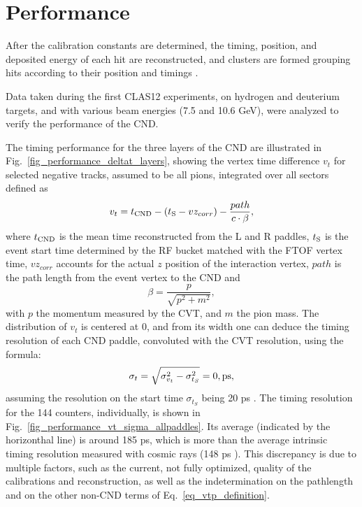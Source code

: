 \section{Performance}
After the calibration constants are determined, the timing, position, and deposited energy of each hit are reconstructed, and clusters are formed grouping hits according to their position and timings \cite{recon-nim}.

Data taken during the first CLAS12 experiments, on hydrogen and deuterium targets, and with various beam energies (7.5 and 10.6 GeV), were analyzed to verify the performance of the CND. 

The timing performance for the three layers of the CND are illustrated in Fig.~\ref{fig_performance_deltat_layers}, showing the vertex time difference $v_t$ for selected negative tracks, assumed to be all pions, integrated over all sectors defined as
\begin{equation}\label{eq_vtp_definition}
v_t=t_{\rm{CND}}-(t_{\rm{S}}-vz_{corr})-\frac{path}{c \cdot \beta} ,
\end{equation}
where $t_{\rm{CND}}$ is the mean time reconstructed from the L and R paddles, $t_{\rm{S}}$ is the event start time determined by the RF bucket matched with the FTOF vertex time, $vz_{corr}$ accounts for the actual $z$ position of the interaction vertex, $path$ is the path length from the event vertex to the CND and
\begin{equation}\label{eq_beta_definition}
  \beta=\frac{p}{\sqrt{p^2+m^2}},
\end{equation}
with $p$ the momentum measured by the CVT, and $m$ the pion mass. 
The distribution of $v_t$ is centered at 0, and from its width one can deduce the timing resolution of each CND paddle, convoluted with the CVT resolution, using the formula:
\begin{equation}\label{eq_resolution}
\sigma_t=\sqrt{\sigma_{v_t}^2-\sigma_{t_{S}}^2}=0 , \rm{ps}, 
\end{equation}
assuming the resolution on the start time $\sigma_{t_{S}}$ being 20 ps \cite{ftof-nim}.
The timing resolution for the 144 counters, individually, is shown in Fig.~\ref{fig_performance_vt_sigma_allpaddles}. Its average (indicated by the horizonthal line) is around 185 ps, which is more than the average intrinsic timing resolution measured with cosmic rays (148 ps \cite{Niccolai:2018qzm}). This discrepancy is due to multiple factors, such as the current, not fully optimized, quality of the calibrations and reconstruction, as well as the indetermination on the pathlength and on the other non-CND terms of Eq.~\ref{eq_vtp_definition}.
